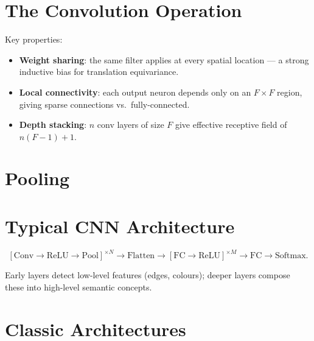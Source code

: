 \documentclass[oneside]{book}
\begin{document}
\section{The Convolution Operation}


Key properties:
\begin{itemize}
  \item \textbf{Weight sharing}: the same filter applies at every spatial
        location — a strong inductive bias for translation equivariance.
  \item \textbf{Local connectivity}: each output neuron depends only on an
        $F \times F$ region, giving sparse connections vs.\ fully-connected.
  \item \textbf{Depth stacking}: $n$ conv layers of size $F$ give effective
        receptive field of $n(F-1)+1$.
\end{itemize}

\section{Pooling}


\section{Typical CNN Architecture}

\[
    [\mathrm{Conv} \to \mathrm{ReLU} \to \mathrm{Pool}]^{\times N}
    \to \mathrm{Flatten}
    \to [\mathrm{FC} \to \mathrm{ReLU}]^{\times M}
    \to \mathrm{FC} \to \mathrm{Softmax}.
\]

Early layers detect low-level features (edges, colours); deeper layers
compose these into high-level semantic concepts.

\section{Classic Architectures}
\end{document}
